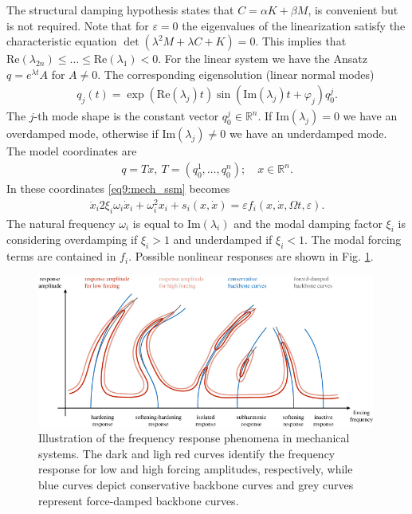 The structural damping hypothesis states that $C = \alpha K + \beta M$, is convenient but is not required. Note that for $\varepsilon=0$ the eigenvalues of the linearization satisfy the characteristic equation $\det(\lambda^2 M + \lambda C + K) = 0$. This implies that $ \textrm{Re}(\lambda _{2n})\leq \ldots \leq  \textrm{Re} (\lambda _1) < 0$. For the linear system we have the Ansatz $q = e^{\lambda t}A$ for $A\neq 0$. The corresponding eigensolution (linear normal modes)
\begin{align}
	q_{j}(t) = \exp( \textrm{Re} (\lambda_j)t) \sin( \textrm{Im} (\lambda_j)t + \varphi_j) q_{0}^{j}.
\end{align}
The $j$-th mode shape is the constant vector $q_{0}^{j}\in \mathbb{R}^{n}$. If $ \textrm{Im} (\lambda_j) = 0$ we have an overdamped mode, otherwise if $ \textrm{Im} (\lambda _j)\neq 0$ we have an underdamped mode. The model coordinates are 
\begin{align}
	q=Tx,\ T = ( q_{0}^{1},\ldots, q_{0}^{n})	;\quad x \in \mathbb{R}^{n}.
\end{align}
In these coordinates \eqref{eq9:mech_ssm} becomes
\begin{align}
	\ddot{x}_{i}2 \xi_i\omega_i \dot{x}_{i} + \omega_{i}^{2}x_i + s_i(x, \dot{x}) = \varepsilon f_i(x, \dot{x}, \Omega t, \varepsilon).
\end{align}
The natural frequency $\omega_i$ is equal to $ \textrm{Im} (\lambda_i)$ and the modal damping factor $\xi_i$ is considering overdamping if $\xi_i >1$ and underdamped if $\xi_i<1$. The modal forcing terms are contained in $f_i$. Possible nonlinear responses are shown in Fig. \ref{fig:frf}.
\begin{figure}[h!]
	\centering
	\includegraphics[width=0.99\textwidth]{figures/ch9/frf.pdf}
	\caption{Illustration of the frequency response phenomena in mechanical systems. The dark and ligh red curves identify the frequency response for low and high forcing amplitudes, respectively, while blue curves depict conservative backbone curves and grey curves represent force-damped backbone curves. \cite{Cenedese_2020}}
	\label{fig:frf}
\end{figure}

